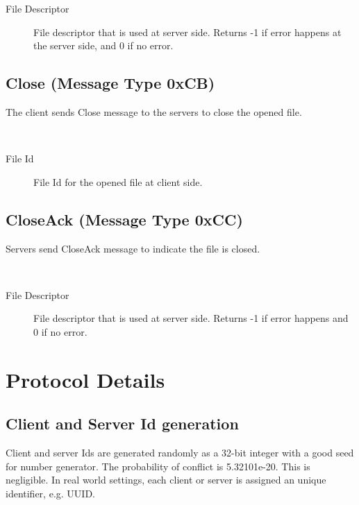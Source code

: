 \documentclass[12pt,fleqn]{article}
\begin{document}
\begin{description}
	\item[File Descriptor] File descriptor that is used at server side. Returns -1 if error happens at the server side, and 0 if no error.
\end{description}

\subsection{Close (Message Type 0xCB)}
The client sends Close message to the servers to close the opened file.

\begin{center}
	\begin{bytefield}[bitwidth=1.1em]{16}
		 \\
	\end{bytefield}
\end{center}

\begin{description}
	\item[File Id] File Id for the opened file at client side.
\end{description}

\subsection{CloseAck (Message Type 0xCC)}
Servers send CloseAck message to indicate the file is closed.

\begin{center}
	\begin{bytefield}[bitwidth=1.1em]{16}
		 \\
	\end{bytefield}
\end{center}

\begin{description}
	\item[File Descriptor] File descriptor that is used at server side. Returns -1 if error happens and 0 if no error.
\end{description}

\section{Protocol Details}

\subsection{Client and Server Id generation}
Client and server Ids are generated randomly as a 32-bit integer with a good seed for number generator. The probability of conflict is 5.32101e-20. This is negligible. In real world settings, each client or server is assigned an unique identifier, e.g. UUID.
\end{document}
